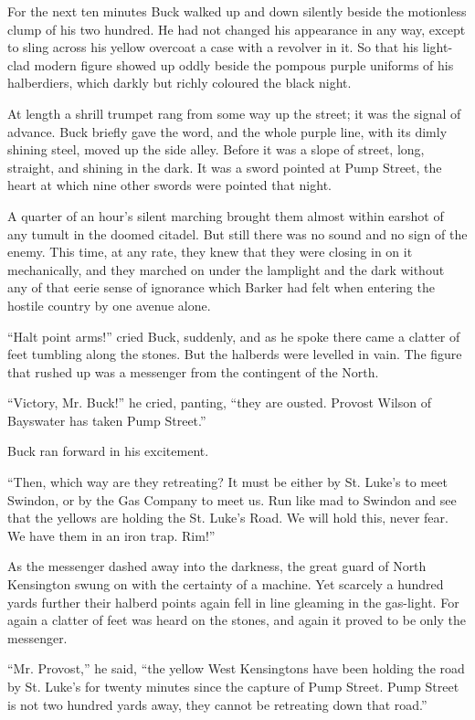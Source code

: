 \documentclass{book}
\begin{document}
For the next ten minutes Buck walked up and down silently beside the motionless clump of his two hundred. He had not changed his appearance in any way, except to sling across his yellow overcoat a case with a revolver in it. So that his light-clad modern figure showed up oddly beside the pompous purple uniforms of his halberdiers, which darkly but richly coloured the black night.

At length a shrill trumpet rang from some way up the street; it was the signal of advance. Buck briefly gave the word, and the whole purple line, with its dimly shining steel, moved up the side alley. Before it was a slope of street, long, straight, and shining in the dark. It was a sword pointed at Pump Street, the heart at which nine other swords were pointed that night.

A quarter of an hour’s silent marching brought them almost within earshot of any tumult in the doomed citadel. But still there was no sound and no sign of the enemy. This time, at any rate, they knew that they were closing in on it mechanically, and they marched on under the lamplight and the dark without any of that eerie sense of ignorance which Barker had felt when entering the hostile country by one avenue alone.

“Halt point arms!” cried Buck, suddenly, and as he spoke there came a clatter of feet tumbling along the stones. But the halberds were levelled in vain. The figure that rushed up was a messenger from the contingent of the North.

“Victory, Mr. Buck!” he cried, panting, “they are ousted. Provost Wilson of Bayswater has taken Pump Street.”

Buck ran forward in his excitement.

“Then, which way are they retreating? It must be either by St. Luke’s to meet Swindon, or by the Gas Company to meet us. Run like mad to Swindon and see that the yellows are holding the St. Luke’s Road. We will hold this, never fear. We have them in an iron trap. Rim!”

As the messenger dashed away into the darkness, the great guard of North Kensington swung on with the certainty of a machine. Yet scarcely a hundred yards further their halberd points again fell in line gleaming in the gas-light. For again a clatter of feet was heard on the stones, and again it proved to be only the messenger.

“Mr. Provost,” he said, “the yellow West Kensingtons have been holding the road by St. Luke’s for twenty minutes since the capture of Pump Street. Pump Street is not two hundred yards away, they cannot be retreating down that road.”
\end{document}
